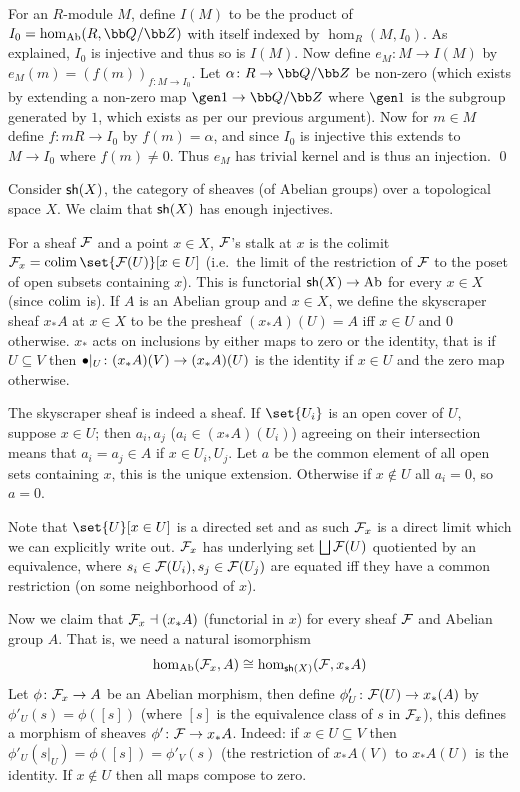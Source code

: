 \bproof

    For an $R$-module $M$, define $I(M)$ to be the product of $I_0=\hom_\Ab(R,\bQ/\bZ)$ with itself indexed by $\hom_R(M,I_0)$.
    As explained, $I_0$ is injective and thus so is $I(M)$.
    Now define $e_M\colon M\to I(M)$ by $e_M(m)=(f(m))_{f\colon M\to I_0}$.
    Let $\alpha\colon R\to\bQ/\bZ$ be non-zero (which exists by extending a non-zero map $\gen1\to\bQ/\bZ$ where $\gen1$ is the subgroup generated by $1$, which exists as per
    our previous argument).
    Now for $m\in M$ define $f\colon mR\to I_0$ by $f(m)=\alpha$, and since $I_0$ is injective this extends to $M\to I_0$ where $f(m)\neq0$.
    Thus $e_M$ has trivial kernel and is thus an injection.
    \qed

\eproof

\bexam

    Consider ${\sf sh}(X)$, the category of sheaves (of Abelian groups) over a topological space $X$.
    We claim that ${\sf sh}(X)$ has enough injectives.

    For a sheaf ${{\cal F}}$ and a point $x\in X$, ${{\cal F}}$'s {\emphcolor stalk} at $x$ is the colimit $\F_x=\colim\set{\F(U)}[x\in U]$ (i.e.\ the limit of the restriction of ${{\cal F}}$ to the poset of open subsets containing $x$).
    This is functorial ${\sf sh}(X)\to{\rm Ab}$ for every $x\in X$ (since $\mathop{\rm colim}\nolimits$ is).
    If $A$ is an Abelian group and $x\in X$, we define the {\emphcolor skyscraper sheaf} $x_*A$ at $x\in X$ to be the presheaf $(x_*A)(U)=A$ iff $x\in U$ and $0$ otherwise.
    $x_*$ acts on inclusions by either maps to zero or the identity, that is if $U\subseteq V$ then $\bullet|_U\colon(x_*A)(V)\to(x_*A)(U)$ is the identity if $x\in U$ and the zero map otherwise.

    The skyscraper sheaf is indeed a sheaf.
    If $\set{U_i}$ is an open cover of $U$, suppose $x\in U$; then $a_i,a_j$ ($a_i\in(x_*A)(U_i)$) agreeing on their intersection means that $a_i=a_j\in A$ if $x\in U_i,U_j$.
    Let $a$ be the common element of all open sets containing $x$, this is the unique extension.
    Otherwise if $x\notin U$ all $a_i=0$, so $a=0$.

    Note that $\set{U}[x\in U]$ is a directed set and as such ${{\cal F}}_x$ is a direct limit which we can explicitly write out.
    ${{\cal F}}_x$ has underlying set $\bigsqcup{{\cal F}}(U)$ quotiented by an equivalence, where $s_i\in{{\cal F}}(U_i),s_j\in{{\cal F}}(U_j)$ are equated iff they have a common restriction (on some neighborhood of $x$).

    Now we claim that ${{\cal F}}_x\dashv(x_*A)$ (functorial in $x$) for every sheaf ${{\cal F}}$ and Abelian group $A$.
    That is, we need a natural isomorphism
    $$ \hom_{\rm Ab}({{\cal F}}_x,A) \cong \hom_{{\sf sh}(X)}({{\cal F}},x_*A) $$
    Let $\phi\colon{{\cal F}}_x\to A$ be an Abelian morphism, then define $\phi'_U\colon{{\cal F}}(U)\to x_*(A)$ by $\phi'_U(s)=\phi([s])$ (where $[s]$ is the equivalence class of $s$ in ${{\cal F}}_x$), this defines a morphism of sheaves
    $\phi'\colon{{\cal F}}\to x_*A$.
    Indeed: if $x\in U\subseteq V$ then $\phi'_U(s|_U)=\phi([s])=\phi'_V(s)$ (the restriction of $x_*A(V)$ to $x_*A(U)$ is the identity.
    If $x\notin U$ then all maps compose to zero.

